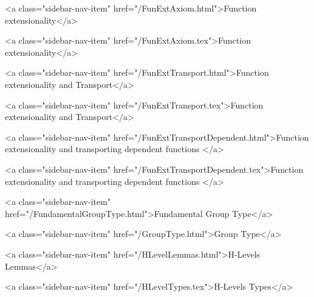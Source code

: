       
    
      
        
          <a class="sidebar-nav-item" href="/FunExtAxiom.html">Function extensionality</a>
        
      
    
      
        
          <a class="sidebar-nav-item" href="/FunExtAxiom.tex">Function extensionality</a>
        
      
    
      
        
          <a class="sidebar-nav-item" href="/FunExtTransport.html">Function extensionality and Transport</a>
        
      
    
      
        
          <a class="sidebar-nav-item" href="/FunExtTransport.tex">Function extensionality and Transport</a>
        
      
    
      
        
          <a class="sidebar-nav-item" href="/FunExtTransportDependent.html">Function extensionality and transporting dependent functions </a>
        
      
    
      
        
          <a class="sidebar-nav-item" href="/FunExtTransportDependent.tex">Function extensionality and transporting dependent functions </a>
        
      
    
      
        
          <a class="sidebar-nav-item" href="/FundamentalGroupType.html">Fundamental Group Type</a>
        
      
    
      
        
          <a class="sidebar-nav-item" href="/GroupType.html">Group Type</a>
        
      
    
      
        
          <a class="sidebar-nav-item" href="/HLevelLemmas.html">H-Levels Lemmas</a>
        
      
    
      
        
          <a class="sidebar-nav-item" href="/HLevelTypes.tex">H-Levels Types</a>
        
      
    

